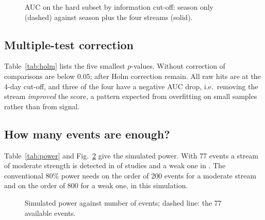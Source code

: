 \begin{figure}[t]
\centering{}
\caption{AUC on the hard subset by information cut-off: season only (dashed) against season plus the four streams (solid).}\label{fig:lead}
\end{figure}

\subsection{Multiple-test correction}
Table~\ref{tab:holm} lists the five smallest $p$-values. Without correction \nRawSig{} of \nTests{} comparisons are below 0.05; after Holm correction \nHolmSig{} remain. All raw hits are at the 4-day cut-off, and three of the four have a negative AUC drop, i.e.\ removing the stream \emph{improved} the score, a pattern expected from overfitting on small samples rather than from signal.

\begin{table}[t]
\centering\caption{Smallest $p$-values among all comparisons, raw and Holm-adjusted.}\label{tab:holm}
\small{}
\end{table}

\subsection{How many events are enough?}
Table~\ref{tab:power} and Fig.~\ref{fig:power} give the simulated power. With 77 events a stream of moderate strength is detected in \powerModAtN{} of studies and a weak one in \powerWeakAtN. The conventional 80\% power needs on the order of 200 events for a moderate stream and on the order of 800 for a weak one, in this simulation.

\begin{table}[t]
\centering\caption{Simulated power: share of studies detecting a real stream, by number of events.}\label{tab:power}
\small{}
\end{table}

\begin{figure}[t]
\centering{}
\caption{Simulated power against number of events; dashed line: the 77 available events.}\label{fig:power}
\end{figure}

